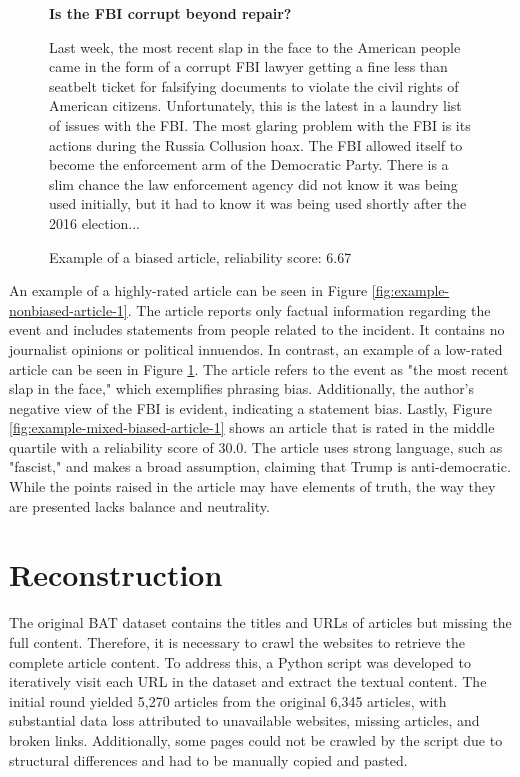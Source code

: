 \begin{figure}[htbp]
    \centering
    \begin{minipage}{1\linewidth}
        \begin{center}
            \small{\textbf{Is the FBI corrupt beyond repair?}}
        \end{center}
        \scriptsize{
            Last week, the most recent slap in the face to the American people came in the form of a corrupt FBI lawyer getting a fine less than seatbelt ticket for falsifying documents to violate the civil rights of American citizens. Unfortunately, this is the latest in a laundry list of issues with the FBI. The most glaring problem with the FBI is its actions during the Russia Collusion hoax. The FBI allowed itself to become the enforcement arm of the Democratic Party. There is a slim chance the law enforcement agency did not know it was being used initially, but it had to know it was being used shortly after the 2016 election...
        }
    \end{minipage}
    \caption{Example of a biased article, reliability score: 6.67}
    \label{fig:example-biased-article-1}
\end{figure}

An example of a highly-rated article can be seen in Figure \ref{fig:example-nonbiased-article-1}. The article reports only factual information regarding the event and includes statements from people related to the incident. It contains no journalist opinions or political innuendos. In contrast, an example of a low-rated article can be seen in Figure \ref{fig:example-biased-article-1}. The article refers to the event as "the most recent slap in the face," which exemplifies phrasing bias. Additionally, the author's negative view of the FBI is evident, indicating a statement bias. Lastly, Figure \ref{fig:example-mixed-biased-article-1} shows an article that is rated in the middle quartile with a reliability score of 30.0. The article uses strong language, such as "fascist," and makes a broad assumption, claiming that Trump is anti-democratic. While the points raised in the article may have elements of truth, the way they are presented lacks balance and neutrality.

\section{Reconstruction}

The original BAT dataset contains the titles and URLs of articles but missing the full content. Therefore, it is necessary to crawl the websites to retrieve the complete article content. To address this, a Python script was developed to iteratively visit each URL in the dataset and extract the textual content. The initial round yielded 5,270 articles from the original 6,345 articles, with substantial data loss attributed to unavailable websites, missing articles, and broken links. Additionally, some pages could not be crawled by the script due to structural differences and had to be manually copied and pasted.

